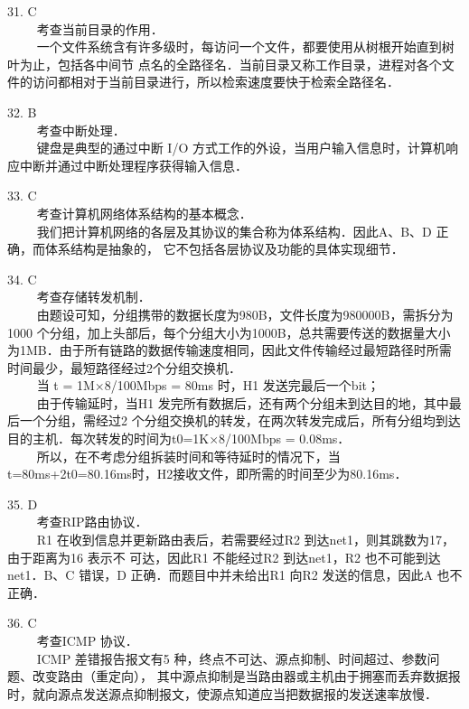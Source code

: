31. C \\
$\qquad$ 考查当前目录的作用．\\
$\qquad$ 一个文件系统含有许多级时，每访问一个文件，都要使用从树根开始直到树叶为止，包括各中间节
点名的全路径名．当前目录又称工作目录，进程对各个文件的访问都相对于当前目录进行，所以检索速度要快于检索全路径名．

32. B \\
$\qquad$ 考查中断处理．\\
$\qquad$ 键盘是典型的通过中断 I/O 方式工作的外设，当用户输入信息时，计算机响应中断并通过中断处理程序获得输入信息．

33. C \\
$\qquad$ 考查计算机网络体系结构的基本概念．\\
$\qquad$ 我们把计算机网络的各层及其协议的集合称为体系结构．因此A、B、D 正确，而体系结构是抽象的，
它不包括各层协议及功能的具体实现细节．

34. C \\
$\qquad$ 考查存储转发机制．\\
$\qquad$ 由题设可知，分组携带的数据长度为980B，文件长度为980000B，需拆分为1000 个分组，加上头部后，每个分组大小为1000B，总共需要传送的数据量大小为1MB．由于所有链路的数据传输速度相同，因此文件传输经过最短路径时所需时间最少，最短路径经过2个分组交换机．\\
$\qquad$ 当 t = 1M×8/100Mbps = 80ms 时，H1 发送完最后一个bit；\\
$\qquad$ 由于传输延时，当H1 发完所有数据后，还有两个分组未到达目的地，其中最后一个分组，需经过2
个分组交换机的转发，在两次转发完成后，所有分组均到达目的主机．每次转发的时间为t0=1K×8/100Mbps = 0.08ms．\\
$\qquad$ 所以，在不考虑分组拆装时间和等待延时的情况下，当 t=80ms+2t0=80.16ms时，H2接收文件，即所需的时间至少为80.16ms．

35. D \\
$\qquad$ 考查RIP路由协议．\\
$\qquad$ R1 在收到信息并更新路由表后，若需要经过R2 到达net1，则其跳数为17，由于距离为16 表示不
可达，因此R1 不能经过R2 到达net1，R2 也不可能到达net1．B、C 错误，D 正确．而题目中并未给出R1 向R2 发送的信息，因此A 也不正确．

36. C \\
$\qquad$ 考查ICMP 协议．\\
$\qquad$ ICMP 差错报告报文有5 种，终点不可达、源点抑制、时间超过、参数问题、改变路由（重定向），
其中源点抑制是当路由器或主机由于拥塞而丢弃数据报时，就向源点发送源点抑制报文，使源点知道应当把数据报的发送速率放慢．

